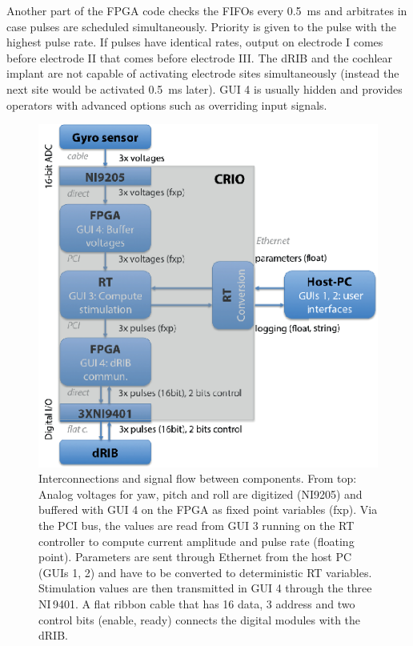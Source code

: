 Another part of the FPGA code checks the FIFOs every \SI{0.5}{\milli\second} and arbitrates in case pulses are scheduled simultaneously. Priority is given to the pulse with the highest pulse rate. If pulses have identical rates, output on electrode I comes before electrode II that comes before electrode III. The dRIB and the cochlear implant are not capable of activating electrode sites simultaneously (instead the next site would be activated \SI{0.5}{\milli\second} later).
GUI 4 is usually hidden and provides operators with advanced options such as overriding input signals.
\begin{figure}[btp]
\centering
\includegraphics{chapters/partii/crio/figures/Fig_CRIO_interconnection.eps} 
\caption[CompactRIO interconnection and signal flow]{Interconnections and signal flow between components. From top: Analog voltages for yaw, pitch and roll are digitized (NI9205) and buffered with GUI 4 on the FPGA as fixed point variables (fxp). Via the PCI bus, the values are read from GUI 3 running on the RT controller to compute current amplitude and pulse rate (floating point). Parameters are sent through Ethernet from the host PC (GUIs 1, 2) and have to be converted to deterministic RT variables. Stimulation values are then transmitted in GUI 4 through the three NI\,9401. A flat ribbon cable that has 16 data, 3 address and two control bits (enable, ready) connects the digital modules with the dRIB.}
\label{fig:crio:interconnections}
\end{figure}
